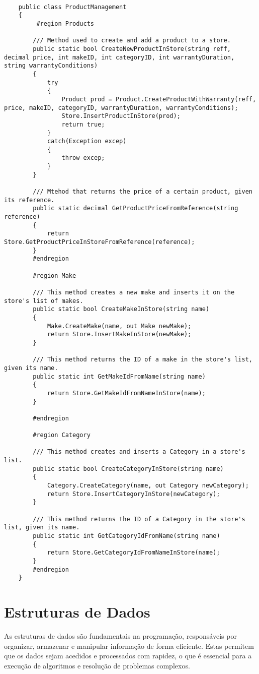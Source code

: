 \documentclass[11pt]{scrartcl} %
\begin{document}
\vspace{15px}
\begin{lstlisting}[language={[Sharp]C}, caption={Classe ProductManagement.cs}, label={Classe ProductManagement.cs}]
	
	public class ProductManagement
	{
		 #region Products
		 
		/// Method used to create and add a product to a store.
		public static bool CreateNewProductInStore(string reff, decimal price, int makeID, int categoryID, int warrantyDuration, string warrantyConditions)
		{
			try
			{
				Product prod = Product.CreateProductWithWarranty(reff, price, makeID, categoryID, warrantyDuration, warrantyConditions);
				Store.InsertProductInStore(prod);
				return true;
			}
			catch(Exception excep)
			{
				throw excep;
			}
		}
		
		/// Mtehod that returns the price of a certain product, given its reference.
		public static decimal GetProductPriceFromReference(string reference)
		{
			return Store.GetProductPriceInStoreFromReference(reference);
		}
		#endregion
		
		#region Make

		/// This method creates a new make and inserts it on the store's list of makes.
		public static bool CreateMakeInStore(string name)
		{
			Make.CreateMake(name, out Make newMake);
			return Store.InsertMakeInStore(newMake);
		}
		
		/// This method returns the ID of a make in the store's list, given its name.
		public static int GetMakeIdFromName(string name)
		{
			return Store.GetMakeIdFromNameInStore(name);
		}
		
		#endregion
		
		#region Category

		/// This method creates and inserts a Category in a store's list.
		public static bool CreateCategoryInStore(string name)
		{
			Category.CreateCategory(name, out Category newCategory);
			return Store.InsertCategoryInStore(newCategory);
		}
		
		/// This method returns the ID of a Category in the store's list, given its name.
		public static int GetCategoryIdFromName(string name)
		{
			return Store.GetCategoryIdFromNameInStore(name);
		}
		#endregion
	}
\end{lstlisting}

\section{Estruturas de Dados}
As estruturas de dados são fundamentais na programação, responsáveis por organizar, armazenar e manipular informaçâo de forma eficiente. Estas permitem que os dados sejam acedidos e processados com rapidez, o que é essencial para a execução de algoritmos e resolução de problemas complexos.
\end{document}
